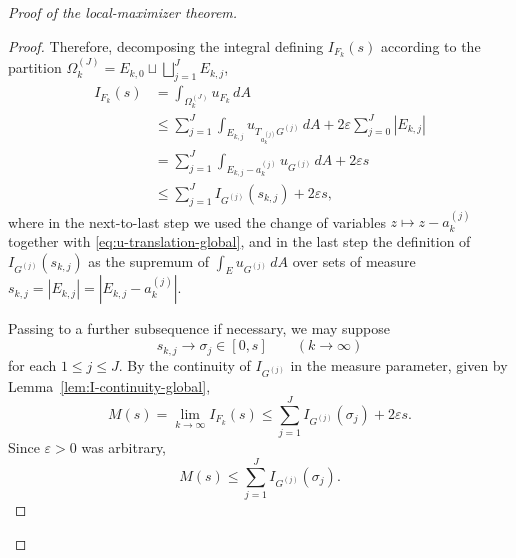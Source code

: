 \documentclass[a4paper,11pt,reqno]{amsart}
\numberwithin{equation}{section}
\theoremstyle{plain} %
\theoremstyle{definition} %
\theoremstyle{remark}
\begin{document}
\begin{proof}[Proof of the local-maximizer theorem]
\begin{proof}
Therefore, decomposing the integral defining \(I_{F_k}(s)\) according to the
partition \(\Omega_k^{(J)}=E_{k,0}\sqcup\bigsqcup_{j=1}^J E_{k,j}\),
\begin{align*}
I_{F_k}(s)
&=
\int_{\Omega_k^{(J)}} u_{F_k}\,dA \\
&\le
\sum_{j=1}^J \int_{E_{k,j}} u_{T_{a_k^{(j)}}G^{(j)}}\,dA
+2\varepsilon \sum_{j=0}^J |E_{k,j}| \\
&=
\sum_{j=1}^J \int_{E_{k,j}-a_k^{(j)}} u_{G^{(j)}}\,dA
+2\varepsilon s \\
&\le
\sum_{j=1}^J I_{G^{(j)}}(s_{k,j})
+2\varepsilon s,
\end{align*}
where in the next-to-last step we used the change of variables
\(z\mapsto z-a_k^{(j)}\) together with \eqref{eq:u-translation-global}, and
in the last step the definition of \(I_{G^{(j)}}(s_{k,j})\) as the supremum
of \(\int_E u_{G^{(j)}}\,dA\) over sets of measure
\(s_{k,j}=|E_{k,j}|=|E_{k,j}-a_k^{(j)}|\).

Passing to a further subsequence if necessary, we may suppose
\[
s_{k,j}\to \sigma_j\in [0,s]
\qquad (k\to\infty)
\]
for each \(1\le j\le J\). By the continuity of \(I_{G^{(j)}}\) in the
measure parameter, given by Lemma~\ref{lem:I-continuity-global},
\[
M(s)=\lim_{k\to\infty}I_{F_k}(s)
\le
\sum_{j=1}^J I_{G^{(j)}}(\sigma_j)+2\varepsilon s.
\]
Since \(\varepsilon>0\) was arbitrary,
\begin{equation}\label{eq:M-upper-profiles-global}
M(s)\le \sum_{j=1}^J I_{G^{(j)}}(\sigma_j).
\end{equation}


\end{proof}
\end{proof}
\end{document}
